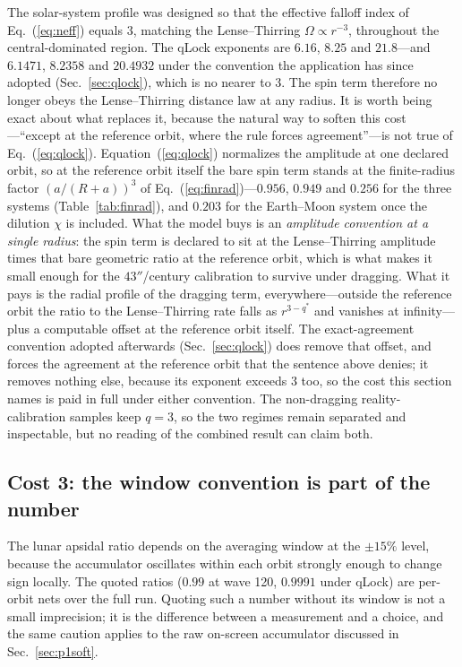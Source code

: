 \documentclass[aps,reprint,amsmath,amssymb,nofootinbib,superscriptaddress,floatfix]{revtex4-2}
\begin{document}
The solar-system profile was designed so that the effective falloff
index of Eq.~(\ref{eq:neff}) equals $3$, matching the
Lense--Thirring $\Omega\propto r^{-3}$, throughout the
central-dominated region.
The qLock exponents are $6.16$, $8.25$ and $21.8$---and $6.1471$,
$8.2358$ and $20.4932$ under the convention the application has since
adopted (Sec.~\ref{sec:qlock}), which is no nearer to $3$.
The spin term therefore no longer obeys the Lense--Thirring distance
law at any radius.
It is worth being exact about what replaces it, because the natural way
to soften this cost---``except at the reference orbit, where the rule
forces agreement''---is not true of Eq.~(\ref{eq:qlock}).
Equation~(\ref{eq:qlock}) normalizes the amplitude at one declared
orbit, so at the reference orbit itself the bare spin term stands at the
finite-radius factor $(a/(R+a))^{3}$ of Eq.~(\ref{eq:finrad})---$0.956$,
$0.949$ and $0.256$ for the three systems (Table~\ref{tab:finrad}), and
$0.203$ for the Earth--Moon system once the dilution $\chi$ is
included.
What the model buys is an \emph{amplitude convention at a single
radius}: the spin term is declared to sit at the Lense--Thirring
amplitude times that bare geometric ratio at the reference orbit, which
is what makes it small enough for the $43''$/century calibration to
survive under dragging.
What it pays is the radial profile of the dragging term,
everywhere---outside the reference orbit the ratio to the
Lense--Thirring rate falls as $r^{3-q^{*}}$ and vanishes at
infinity---plus a computable offset at the reference orbit itself.
The exact-agreement convention adopted afterwards
(Sec.~\ref{sec:qlock}) does remove that offset, and forces the
agreement at the reference orbit that the sentence above denies; it
removes nothing else, because its exponent exceeds $3$ too, so the
cost this section names is paid in full under either convention.
The non-dragging reality-calibration samples keep $q=3$, so the two
regimes remain separated and inspectable, but no reading of the
combined result can claim both.

\subsection{Cost 3: the window convention is part of the number}
\label{sec:cost3}

The lunar apsidal ratio depends on the averaging window at the $\pm15\%$
level, because the accumulator oscillates within each orbit strongly
enough to change sign locally.
The quoted ratios ($0.99$ at wave 120, $0.9991$ under qLock) are
per-orbit nets over the full run.
Quoting such a number without its window is not a small imprecision; it
is the difference between a measurement and a choice, and the same
caution applies to the raw on-screen accumulator discussed in
Sec.~\ref{sec:p1soft}.
\end{document}
